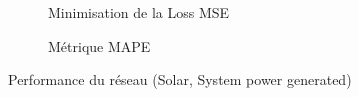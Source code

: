 \documentclass{article}
\begin{document}
     \begin{figure}[H]
        \centering
        \begin{subfigure}[t]{0.49\textwidth}
            \caption{Minimisation de la Loss MSE}
        \end{subfigure}
        \hfill
        \begin{subfigure}[t]{0.49\textwidth}
        \caption{Métrique MAPE}
    \end{subfigure}
        \caption{Performance du réseau (Solar, System power generated)}
        \label{fig:test}
    \end{figure}
    
\end{document}

